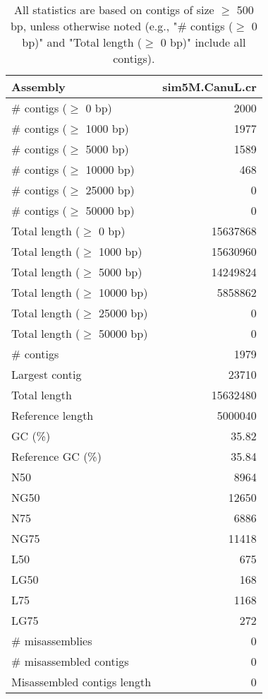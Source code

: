 \documentclass[12pt,a4paper]{article}
\begin{document}
\begin{table}[ht]
\begin{center}
\caption{All statistics are based on contigs of size $\geq$ 500 bp, unless otherwise noted (e.g., "\# contigs ($\geq$ 0 bp)" and "Total length ($\geq$ 0 bp)" include all contigs).}
\begin{tabular}{|l*{1}{|r}|}
\hline
Assembly & sim5M.CanuL.cr \\ \hline
\# contigs ($\geq$ 0 bp) & 2000 \\ \hline
\# contigs ($\geq$ 1000 bp) & 1977 \\ \hline
\# contigs ($\geq$ 5000 bp) & 1589 \\ \hline
\# contigs ($\geq$ 10000 bp) & 468 \\ \hline
\# contigs ($\geq$ 25000 bp) & 0 \\ \hline
\# contigs ($\geq$ 50000 bp) & 0 \\ \hline
Total length ($\geq$ 0 bp) & 15637868 \\ \hline
Total length ($\geq$ 1000 bp) & 15630960 \\ \hline
Total length ($\geq$ 5000 bp) & 14249824 \\ \hline
Total length ($\geq$ 10000 bp) & 5858862 \\ \hline
Total length ($\geq$ 25000 bp) & 0 \\ \hline
Total length ($\geq$ 50000 bp) & 0 \\ \hline
\# contigs & 1979 \\ \hline
Largest contig & 23710 \\ \hline
Total length & 15632480 \\ \hline
Reference length & 5000040 \\ \hline
GC (\%) & 35.82 \\ \hline
Reference GC (\%) & 35.84 \\ \hline
N50 & 8964 \\ \hline
NG50 & 12650 \\ \hline
N75 & 6886 \\ \hline
NG75 & 11418 \\ \hline
L50 & 675 \\ \hline
LG50 & 168 \\ \hline
L75 & 1168 \\ \hline
LG75 & 272 \\ \hline
\# misassemblies & 0 \\ \hline
\# misassembled contigs & 0 \\ \hline
Misassembled contigs length & 0 \\ \hline

\end{tabular}
\end{center}
\end{table}
\end{document}
